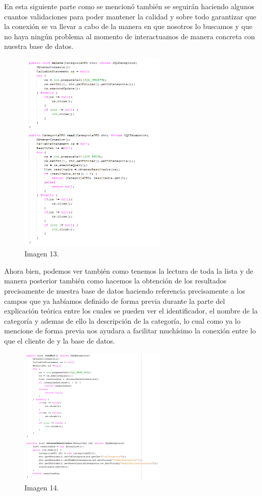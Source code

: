 \documentclass[10pt,a4paper]{article}
\begin{document}
\vspace{60mm}

En esta siguiente parte como se mencionó también se seguirán haciendo algunos cuantos validaciones para poder mantener la calidad y sobre todo garantizar que la conexión se va llevar a cabo de la manera en que nosotros lo buscamos y que no haya ningún problema al momento de interactuamos de manera concreta con nuestra base de datos.

\begin{figure}[h]
\centering
\includegraphics[width=7cm]{CategoriaDao3}
\caption{Imagen 13.}
\label{fig:figure1}
\end{figure}

Ahora bien, podemos ver también como tenemos la lectura de toda la lista y de manera posterior también como hacemos la obtención de los resultados precisamente de nuestra base de datos haciendo referencia precisamente a los campos que ya habíamos definido de forma previa durante la parte del explicación teórica entre los cuales se pueden ver el identificador, el nombre de la categoría y ademas de ello la descripción de la categoría, lo cual como ya lo mencione de forma previa nos ayudara a facilitar muchísimo la conexión entre lo que el cliente de y la base de datos.
\begin{figure}[h]
\centering
\includegraphics[width=7cm]{CategoriaDao4}
\caption{Imagen 14.}
\label{fig:figure1}
\end{figure}
\end{document}
